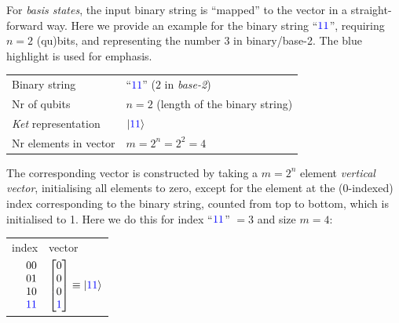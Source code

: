 \documentclass[conference]{IEEEtran}
\begin{document}
For \textit{basis states}, the input binary string is ``mapped'' to the vector in a straight-forward way.
Here we provide an example for the binary string ``$\textcolor{blue}{11}$'',
requiring $n=2$ (qu)bits, and representing the number $3$ in binary/base-2.
The blue highlight is used for emphasis.
\begin{center}
    \begin{tabular}{ll}
        \toprule
        Binary string & ``\textcolor{blue}{$11$}'' ($2$ in \textit{base-2})\\
        Nr of qubits & $n=2$ (length of the binary string) \\
        \textit{Ket} representation & $\ket{\textcolor{blue}{11}}$ \\
        Nr elements in vector & $m=2^n=2^2=4$ \\
        \bottomrule
    \end{tabular}
\end{center}
The corresponding vector is constructed by taking a $m=2^n$ element \textit{vertical vector},
initialising all elements to zero, except for the element at the (0-indexed) index corresponding to the binary string,
counted from top to bottom, which is initialised to 1.
Here we do this for index ``$\textcolor{blue}{11}$'' $=3$ and size $m=4$:


\begin{center}
    \begin{tabular}{r l}

        index & vector\\
        $\begin{matrix} 00 \\ 01 \\ 10 \\ \textcolor{blue}{11} \\ \end{matrix}$
        & $\begin{bmatrix} 0 \\ 0 \\ 0 \\ \textcolor{blue}{1} \\ \end{bmatrix} \equiv \ket{\textcolor{blue}{11}}$  \\

    \end{tabular}
\end{center}
\end{document}
